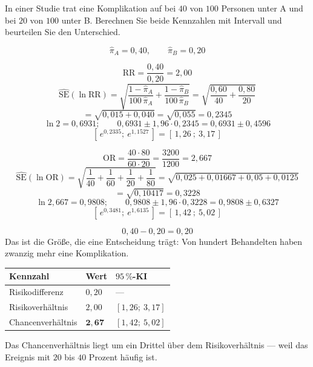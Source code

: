 \begin{aufgabe}
In einer Studie trat eine Komplikation auf bei $40$ von $100$ Personen unter A und bei $20$ von $100$ unter B. Berechnen Sie beide Kennzahlen mit Intervall und beurteilen Sie den Unterschied.

\loesung
{}
\[ \hat\pi_A = 0{,}40, \qquad \hat\pi_B = 0{,}20 \]

\[ \mathrm{RR} = \frac{0{,}40}{0{,}20} = 2{,}00 \]
\[ \widehat{\mathrm{SE}}(\ln \mathrm{RR}) = \sqrt{\frac{1-\hat\pi_A}{100\,\hat\pi_A} + \frac{1-\hat\pi_B}{100\,\hat\pi_B}} = \sqrt{\frac{0{,}60}{40} + \frac{0{,}80}{20}} \]
\[ = \sqrt{0{,}015 + 0{,}040} = \sqrt{0{,}055} = 0{,}2345 \]
\[ \ln 2 = 0{,}6931; \qquad 0{,}6931 \pm 1{,}96 \cdot 0{,}2345 = 0{,}6931 \pm 0{,}4596 \]
\[ [\,e^{0{,}2335};\ e^{1{,}1527}\,] = [\,1{,}26\ ;\ 3{,}17\,] \]

\[ \mathrm{OR} = \frac{40 \cdot 80}{60 \cdot 20} = \frac{3200}{1200} = 2{,}667 \]
\[ \widehat{\mathrm{SE}}(\ln \mathrm{OR}) = \sqrt{\frac{1}{40}+\frac{1}{60}+\frac{1}{20}+\frac{1}{80}} = \sqrt{0{,}025+0{,}01667+0{,}05+0{,}0125} \]
\[ = \sqrt{0{,}10417} = 0{,}3228 \]
\[ \ln 2{,}667 = 0{,}9808; \qquad 0{,}9808 \pm 1{,}96 \cdot 0{,}3228 = 0{,}9808 \pm 0{,}6327 \]
\[ [\,e^{0{,}3481};\ e^{1{,}6135}\,] = [\,1{,}42\ ;\ 5{,}02\,] \]

\[ 0{,}40 - 0{,}20 = 0{,}20 \]
Das ist die Größe, die eine Entscheidung trägt: Von hundert Behandelten haben zwanzig mehr eine Komplikation.

\begin{center}
\renewcommand{\arraystretch}{1.48}
\begin{tabular}{@{}P{3.2cm}P{1.6cm}P{2.6cm}@{}}
\toprule
\textbf{Kennzahl} & \textbf{Wert} & \textbf{$95\,\%$-KI}\\
\midrule
Risikodifferenz & $0{,}20$ & --- \\
Risiko\-verhältnis & $2{,}00$ & $[1{,}26;\ 3{,}17]$\\
Chancen\-verhältnis & $\mathbf{2{,}67}$ & $[1{,}42;\ 5{,}02]$\\
\bottomrule
\end{tabular}
\end{center}

Das Chancenverhältnis liegt um ein Drittel über dem Risikoverhältnis --- weil das Ereignis mit $20$ bis $40$ Prozent häufig ist.

\begin{center}
\begin{minipage}{0.86\textwidth}
\end{minipage}
\end{center}
\end{aufgabe}

